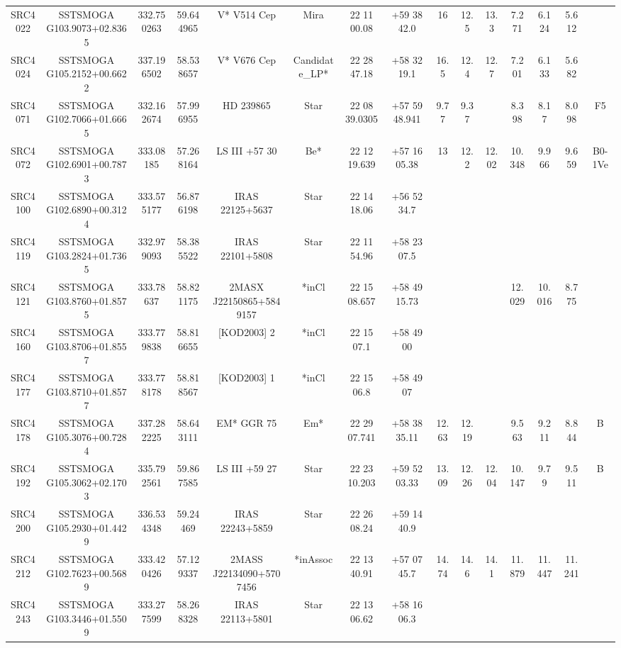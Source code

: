 \begin{table}
\begin{tabular}{ccccccccccccccc}
SRC4022 & SSTSMOGA G103.9073+02.8365 & 332.750263 & 59.644965 & V* V514 Cep & Mira & 22 11 00.08 & +59 38 42.0 & 16 & 12.5 & 13.3 & 7.271 & 6.124 & 5.612 &  \\
SRC4024 & SSTSMOGA G105.2152+00.6622 & 337.196502 & 58.538657 & V* V676 Cep & Candidate_LP* & 22 28 47.18 & +58 32 19.1 & 16.5 & 12.4 & 12.7 & 7.201 & 6.133 & 5.682 &  \\
SRC4071 & SSTSMOGA G102.7066+01.6665 & 332.162674 & 57.996955 & HD 239865 & Star & 22 08 39.0305 & +57 59 48.941 & 9.77 & 9.37 &  & 8.398 & 8.17 & 8.098 & F5 \\
SRC4072 & SSTSMOGA G102.6901+00.7873 & 333.08185 & 57.268164 & LS III +57   30 & Be* & 22 12 19.639 & +57 16 05.38 & 13 & 12.2 & 12.02 & 10.348 & 9.966 & 9.659 & B0-1Ve \\
SRC4100 & SSTSMOGA G102.6890+00.3124 & 333.575177 & 56.876198 & IRAS 22125+5637 & Star & 22 14 18.06 & +56 52 34.7 &  &  &  &  &  &  &  \\
SRC4119 & SSTSMOGA G103.2824+01.7365 & 332.979093 & 58.385522 & IRAS 22101+5808 & Star & 22 11 54.96 & +58 23 07.5 &  &  &  &  &  &  &  \\
SRC4121 & SSTSMOGA G103.8760+01.8575 & 333.78637 & 58.821175 & 2MASX J22150865+5849157 & *inCl & 22 15 08.657 & +58 49 15.73 &  &  &  & 12.029 & 10.016 & 8.775 &  \\
SRC4160 & SSTSMOGA G103.8706+01.8557 & 333.779838 & 58.816655 & [KOD2003] 2 & *inCl & 22 15 07.1 & +58 49 00 &  &  &  &  &  &  &  \\
SRC4177 & SSTSMOGA G103.8710+01.8577 & 333.778178 & 58.818567 & [KOD2003] 1 & *inCl & 22 15 06.8 & +58 49 07 &  &  &  &  &  &  &  \\
SRC4178 & SSTSMOGA G105.3076+00.7284 & 337.282225 & 58.643111 & EM* GGR   75 & Em* & 22 29 07.741 & +58 38 35.11 & 12.63 & 12.19 &  & 9.563 & 9.211 & 8.844 & B \\
SRC4192 & SSTSMOGA G105.3062+02.1703 & 335.792561 & 59.867585 & LS III +59   27 & Star & 22 23 10.203 & +59 52 03.33 & 13.09 & 12.26 & 12.04 & 10.147 & 9.79 & 9.511 & B \\
SRC4200 & SSTSMOGA G105.2930+01.4429 & 336.534348 & 59.24469 & IRAS 22243+5859 & Star & 22 26 08.24 & +59 14 40.9 &  &  &  &  &  &  &  \\
SRC4212 & SSTSMOGA G102.7623+00.5689 & 333.420426 & 57.129337 & 2MASS J22134090+5707456 & *inAssoc & 22 13 40.91 & +57 07 45.7 & 14.74 & 14.6 & 14.1 & 11.879 & 11.447 & 11.241 &  \\
SRC4243 & SSTSMOGA G103.3446+01.5509 & 333.277599 & 58.268328 & IRAS 22113+5801 & Star & 22 13 06.62 & +58 16 06.3 &  &  &  &  &  &  &  \\

\end{tabular}
\end{table}
